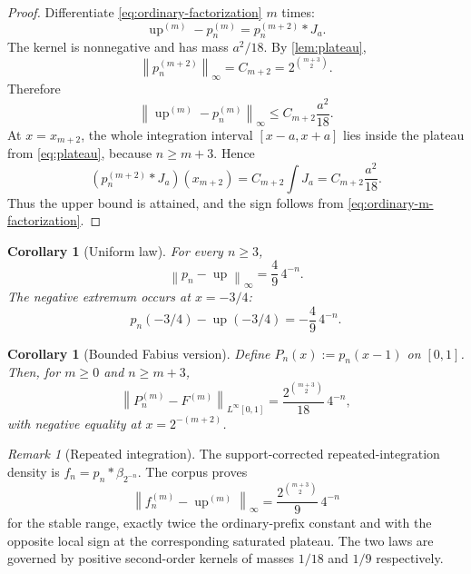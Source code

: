 \documentclass[11pt]{article}
\numberwithin{equation}{section}
\newtheorem{corollary}[theorem]{Corollary}
\theoremstyle{definition}
\theoremstyle{remark}
\newtheorem{remark}[theorem]{Remark}
\newcommand{\Up}{\operatorname{up}}
\newcommand{\norm}[1]{\left\lVert#1\right\rVert}
\begin{document}
\begin{proof}
Differentiate \eqref{eq:ordinary-factorization} $m$ times:
\begin{equation}
 \Up^{(m)}-p_n^{(m)}=p_n^{(m+2)}*J_a.
 \label{eq:ordinary-m-factorization}
\end{equation}
The kernel is nonnegative and has mass $a^2/18$.  By \cref{lem:plateau},
\[
 \norm{p_n^{(m+2)}}_\infty=C_{m+2}=2^{\binom{m+3}{2}}.
\]
Therefore
\[
 \norm{\Up^{(m)}-p_n^{(m)}}_\infty
 \le C_{m+2}\frac{a^2}{18}.
\]
At $x=x_{m+2}$, the whole integration interval
\([x-a,x+a]\) lies inside the plateau from \eqref{eq:plateau}, because $n\ge m+3$.  Hence
\[
 (p_n^{(m+2)}*J_a)(x_{m+2})
 =C_{m+2}\int J_a
 =C_{m+2}\frac{a^2}{18}.
\]
Thus the upper bound is attained, and the sign follows from \eqref{eq:ordinary-m-factorization}.
\end{proof}

\begin{corollary}[Uniform law]
\label{cor:ordinary-uniform}
For every $n\ge3$,
\begin{equation}
 \boxed{\norm{p_n-\Up}_\infty=\frac49\,4^{-n}.}
 \label{eq:ordinary-uniform}
\end{equation}
The negative extremum occurs at $x=-3/4$:
\begin{equation}
 p_n(-3/4)-\Up(-3/4)=-\frac49\,4^{-n}.
 \label{eq:ordinary-at-34}
\end{equation}
\end{corollary}

\begin{corollary}[Bounded Fabius version]
\label{cor:F-ordinary}
Define $P_n(x):=p_n(x-1)$ on $[0,1]$.  Then, for $m\ge0$ and $n\ge m+3$,
\begin{equation}
 \norm{P_n^{(m)}-F^{(m)}}_{L^\infty[0,1]}
 =\frac{2^{\binom{m+3}{2}}}{18}\,4^{-n},
 \label{eq:F-ordinary}
\end{equation}
with negative equality at $x=2^{-(m+2)}$.
\end{corollary}

\begin{remark}[Repeated integration]
The support-corrected repeated-integration density is
\(f_n=p_n*\beta_{2^{-n}}\).  The corpus proves
\[
 \norm{f_n^{(m)}-\Up^{(m)}}_\infty
 =\frac{2^{\binom{m+3}{2}}}{9}\,4^{-n}
\]
for the stable range, exactly twice the ordinary-prefix constant and with the opposite local sign at the corresponding saturated plateau.  The two laws are governed by positive second-order kernels of masses $1/18$ and $1/9$ respectively.
\end{remark}
\end{document}
